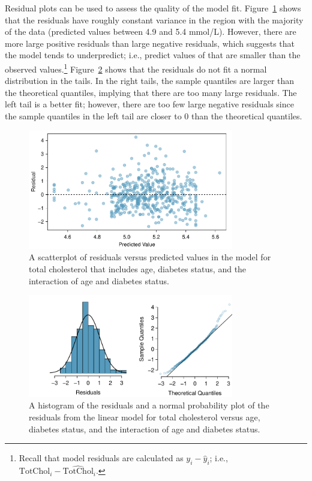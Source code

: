 Residual plots can be used to assess the quality of the model fit. Figure~\ref{nhanesAgeDiabetesCholResidPlot} shows that the residuals have roughly constant variance in the region with the majority of the data (predicted values between 4.9 and 5.4 mmol/L). However, there are more large positive residuals than large negative residuals, which suggests that the model tends to underpredict; i.e., predict values of  that are smaller than the observed values.\footnote{Recall that model residuals are calculated as $y_i - \hat{y}_i$; i.e., $\text{TotChol}_i - \widehat{\text{TotChol}}_i$.} Figure~\ref{nhanesAgeDiabetesCholResidNormPlot} shows that the residuals do not fit a normal distribution in the tails. In the right tails, the sample quantiles are larger than the theoretical quantiles, implying that there are too many large residuals. The left tail is a better fit; however, there are too few large negative residuals since the sample quantiles in the left tail are closer to 0 than the theoretical quantiles.

\begin{figure}[h!]
	\centering
	\includegraphics[width=0.8\textwidth]
	{ch_multiple_linear_regression_oi_biostat/figures/nhanesAgeDiabetesCholResidPlot/nhanesAgeDiabetesCholResidPlot.pdf}
	\caption{A scatterplot of residuals versus predicted values in the model for total cholesterol that includes age, diabetes status, and the interaction of age and diabetes status.}
	\label{nhanesAgeDiabetesCholResidPlot}
\end{figure}

\begin{figure}[h!]
	\centering
	\includegraphics[width=0.8\textwidth]
	{ch_multiple_linear_regression_oi_biostat/figures/nhanesAgeDiabetesCholResidNormPlot/nhanesAgeDiabetesCholResidNormPlot.pdf}
    \caption{A histogram of the residuals and a normal probability plot of the residuals from the linear model for total cholesterol versus age, diabetes status, and the interaction of age and diabetes status.}
   	\label{nhanesAgeDiabetesCholResidNormPlot}
\end{figure}

